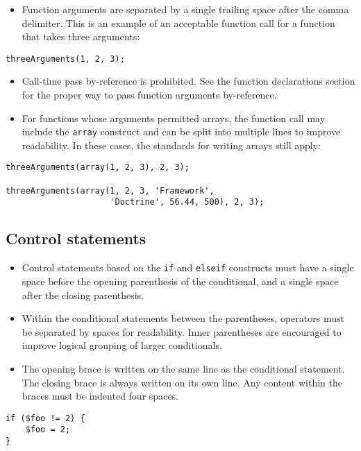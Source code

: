 \documentclass[11pt,a4paper]{report}
\begin{document}
\begin{itemize}
\item{Function arguments are separated by a single trailing space after the comma delimiter. This is an example of an acceptable function call for a function that takes three arguments:}
\end{itemize}
\begin{verbatim}
threeArguments(1, 2, 3);
\end{verbatim}

\begin{itemize}
\item{Call-time pass by-reference is prohibited. See the function declarations section for the proper way to pass function arguments by-reference.}
\item{For functions whose arguments permitted arrays, the function call may include the \texttt{array} construct and can be split into multiple lines to improve readability. In these cases, the standards for writing arrays still apply:}
\end{itemize}
\begin{verbatim}
threeArguments(array(1, 2, 3), 2, 3);

threeArguments(array(1, 2, 3, 'Framework',
                     'Doctrine', 56.44, 500), 2, 3);
\end{verbatim}

\subsection{Control statements}
\begin{itemize}
\item{Control statements based on the \texttt{if} and \texttt{elseif} constructs must have a single space before the opening parenthesis of the conditional, and a single space after the closing parenthesis.}
\item{Within the conditional statements between the parentheses, operators must be separated by spaces for readability. Inner parentheses are encouraged to improve logical grouping of larger conditionals.}
\item{The opening brace is written on the same line as the conditional statement. The closing brace is always written on its own line. Any content within the braces must be indented four spaces.}
\end{itemize}
\begin{verbatim}
if ($foo != 2) {
    $foo = 2;
}
\end{verbatim}
\end{document}
